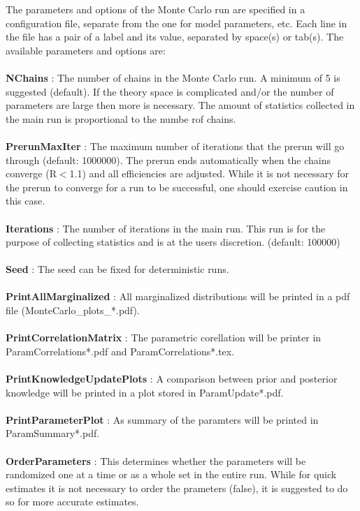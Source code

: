\documentclass[preprint,3p,12pt]{elsarticle}
\begin{document}
The parameters and options of the Monte Carlo run are specified in
a configuration file, separate from the one for model parameters,
etc. Each line in the file has a pair of a label
and its value, separated by space(s) or tab(s). The available
parameters and options are: \\\\
{\bf NChains} : The number of chains in the Monte Carlo run. A minimum of 5 is suggested (default). 
If the theory space is complicated and/or the number of parameters are large then more
is necessary. The amount of statistics collected in the main run is proportional to the
numbe rof chains.\\\\
{\bf PrerunMaxIter} : The maximum number of iterations that the prerun will go through (default: 1000000). 
The prerun ends automatically when the chains converge (R$<$1.1) and all efficiencies 
are adjusted. While it is not necessary for the prerun to converge for a run to be 
successful, one should exercise caution in this case.\\\\
{\bf Iterations} : The number of iterations in the main run. This run is for the purpose of
collecting statistics and is at the users discretion. (default: 100000)\\\\
{\bf Seed} : The seed can be fixed for deterministic runs.\\\\
{\bf PrintAllMarginalized} : All marginalized distributions will be printed in a pdf file
(MonteCarlo\_plots\_*.pdf).\\\\
{\bf PrintCorrelationMatrix} : The parametric corellation will be printer in ParamCorrelations*.pdf
and ParamCorrelations*.tex.\\\\
{\bf PrintKnowledgeUpdatePlots} : A comparison between prior and posterior knowledge will be 
printed in a plot stored in ParamUpdate*.pdf.\\\\
{\bf PrintParameterPlot} : As summary of the paramters will be printed in ParamSummary*.pdf.\\\\
{\bf OrderParameters} : This determines whether the parameters will be randomized one
at a time or as a whole set in the entire run. While for quick estimates it is not necessary
to order the prameters (false), it is suggested to do so for more accurate estimates.\\\\
\end{document}
